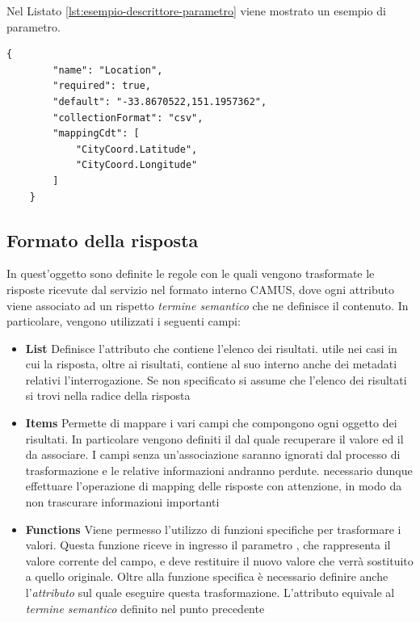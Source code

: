 Nel Listato \ref{lst:esempio-descrittore-parametro} viene mostrato un esempio di parametro.

\begin{lstlisting}[style=blocco-esempi,
								caption=Esempio di parametro,
								label=lst:esempio-descrittore-parametro]
	{
		"name": "Location",
		"required": true,
		"default": "-33.8670522,151.1957362",
		"collectionFormat": "csv",
		"mappingCdt": [
			"CityCoord.Latitude",
			"CityCoord.Longitude"
		]
	}
\end{lstlisting}

\subsection{Formato della risposta\label{sec:descrittore-risposta}}

In quest'oggetto sono definite le regole con le quali vengono trasformate le risposte ricevute dal servizio nel formato interno CAMUS, dove ogni attributo viene associato ad un rispetto \emph{termine semantico} che ne definisce il contenuto. In particolare, vengono utilizzati i seguenti campi:

\begin{itemize}
	\item \textbf{List} Definisce l'attributo che contiene l'elenco dei risultati. \upe utile nei casi in cui la risposta, oltre ai risultati, contiene al suo interno anche dei metadati relativi l'interrogazione. Se non specificato si assume che l'elenco dei risultati si trovi nella radice della risposta
	\item \textbf{Items} Permette di mappare i vari campi che compongono ogni oggetto dei risultati. In particolare vengono definiti il  dal quale recuperare il valore ed il  da associare. I campi senza un'associazione saranno ignorati dal processo di trasformazione e le relative informazioni andranno perdute. \upe necessario dunque effettuare l'operazione di mapping delle risposte con attenzione, in modo da non trascurare informazioni importanti
	\item \textbf{Functions} Viene permesso l'utilizzo di funzioni specifiche per trasformare i valori. Questa funzione riceve in ingresso il parametro , che rappresenta il valore corrente del campo, e deve restituire il nuovo valore che verrà sostituito a quello originale. Oltre alla funzione specifica è necessario definire anche l'\emph{attributo} sul quale eseguire questa trasformazione. L'attributo equivale al \emph{termine semantico} definito nel punto precedente
\end{itemize}

